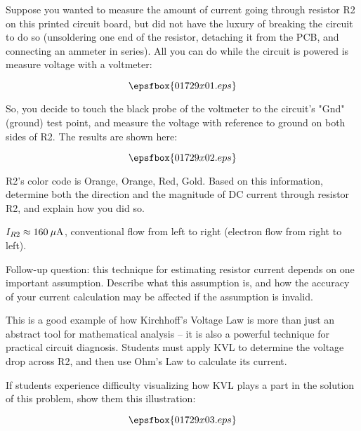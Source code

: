 

Suppose you wanted to measure the amount of current going through resistor R2 on this printed circuit board, but did not have the luxury of breaking the circuit to do so (unsoldering one end of the resistor, detaching it from the PCB, and connecting an ammeter in series).  All you can do while the circuit is powered is measure voltage with a voltmeter:

$$\epsfbox{01729x01.eps}$$

So, you decide to touch the black probe of the voltmeter to the circuit's "Gnd" (ground) test point, and measure the voltage with reference to ground on both sides of R2.  The results are shown here:

$$\epsfbox{01729x02.eps}$$

R2's color code is Orange, Orange, Red, Gold.  Based on this information, determine both the direction and the magnitude of DC current through resistor R2, and explain how you did so.







$I_{R2} \approx 160 \> \mu \hbox{A}$, conventional flow from left to right (electron flow from right to left).

\vskip 10pt

Follow-up question: this technique for estimating resistor current depends on one important assumption.  Describe what this assumption is, and how the accuracy of your current calculation may be affected if the assumption is invalid.







This is a good example of how Kirchhoff's Voltage Law is more than just an abstract tool for mathematical analysis -- it is also a powerful technique for practical circuit diagnosis.  Students must apply KVL to determine the voltage drop across R2, and then use Ohm's Law to calculate its current.

If students experience difficulty visualizing how KVL plays a part in the solution of this problem, show them this illustration:

$$\epsfbox{01729x03.eps}$$




